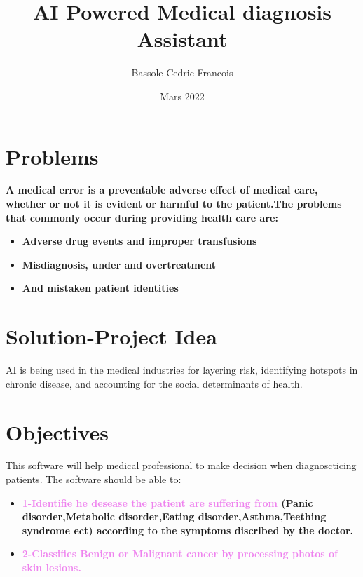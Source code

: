 \documentclass[rnd]{mas_proposal}
\title{AI Powered Medical diagnosis Assistant }
\author{Bassole Cedric-Francois}
\date{Mars 2022}
\begin{document}
\maketitle

\pagestyle{plain}

\section{Problems}
 \textbf{A medical error is a preventable adverse effect of medical care, whether or not it is evident or harmful to the patient.The problems that commonly occur during providing health care are:
}
\begin{itemize}
    \item\textbf{Adverse drug events and improper transfusions } 
    \item\textbf{Misdiagnosis, under and overtreatment}
    \item\textbf{And mistaken patient identities}
\end{itemize}
  
   
   \section{Solution-Project Idea}
   AI is being used in the medical industries  for layering risk, identifying hotspots in chronic disease, and accounting for the social determinants of health.
  
   
\section{Objectives}

This software will  help medical professional to make decision when diagnoscticing patients.
The software  should be able to:\\
\begin{itemize}
    \item\textbf{\textcolor{violet}{1-Identifie he desease the patient are suffering from}
 (Panic disorder,Metabolic disorder,Eating 
disorder,Asthma,Teething syndrome ect) according to the symptoms discribed by the doctor.} 
\item\textbf{\textcolor{violet}{2-Classifies Benign or Malignant cancer by processing photos of skin lesions.}}

\end{itemize}
\end{document}
